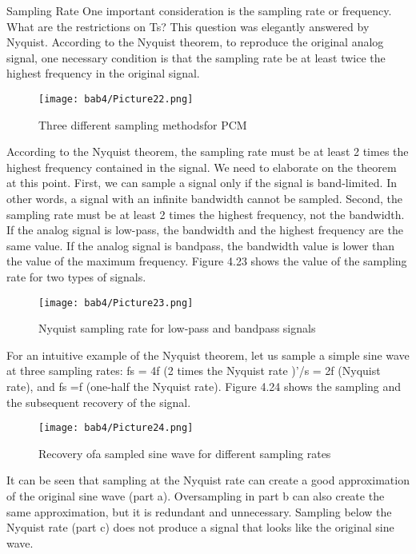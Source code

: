 Sampling Rate One important consideration is the sampling rate or frequency. What are the restrictions on Ts? This question was elegantly answered by Nyquist. According to the Nyquist theorem, to reproduce the original analog signal, one necessary condition is that the sampling rate be at least twice the highest frequency in the original signal.

\begin{figure}
  \centering
  \texttt{[image: bab4/Picture22.png]}
  \caption{Three different sampling methodsfor PCM}
  \label{fig4:22}
\end{figure}

According to the Nyquist theorem, the sampling rate must be at least 2 times the highest frequency contained in the signal. We need to elaborate on the theorem at this point. First, we can sample a signal only if the signal is band-limited. In other words, a signal with an infinite bandwidth cannot be sampled. Second, the sampling rate must be at least 2 times the highest frequency, not the bandwidth. If the analog signal is low-pass, the bandwidth and the highest frequency are the same value. If the analog signal is bandpass, the bandwidth value is lower than the value of the maximum frequency. Figure 4.23 shows the value of the sampling rate for two types of signals.

\begin{figure}
  \centering
  \texttt{[image: bab4/Picture23.png]}
  \caption{Nyquist sampling rate for low-pass and bandpass signals}
  \label{fig4:23}
\end{figure}

\begin{example}
  For an intuitive example of the Nyquist theorem, let us sample a simple sine wave at three sampling rates: fs = 4f (2 times the Nyquist rate )'/s = 2f (Nyquist rate), and fs =f (one-half the Nyquist rate). Figure 4.24 shows the sampling and the subsequent recovery of the signal.
\end{example}

\begin{figure}
  \centering
  \texttt{[image: bab4/Picture24.png]}
  \caption{Recovery ofa sampled sine wave for different sampling rates}
  \label{fig4:24}
\end{figure}

It can be seen that sampling at the Nyquist rate can create a good approximation of the original sine wave (part a). Oversampling in part b can also create the same approximation, but it is redundant and unnecessary. Sampling below the Nyquist rate (part c) does not produce a signal that looks like the original sine wave.

